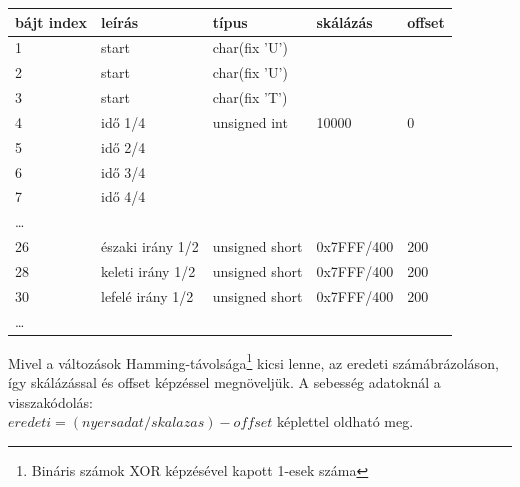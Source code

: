 \documentclass[12pt]{article}
\begin{document}
\begin{itemize}
\begin{center}
    \begin{tabular}{| l | l | l | l |l |}
    \hline
    bájt index & leírás & típus & skálázás & offset \\ \hline
    1 & start & char(fix 'U') &   &    \\ \hline
		2 & start & char(fix 'U') &   &    \\ \hline
		3 & start & char(fix 'T') &   &    \\ \hline
		4 & id\H{o} 1/4 & unsigned int & 10000 & 0  \\ \hline
		5 & id\H{o} 2/4 &   &   &    \\ \hline
		6 & id\H{o} 3/4 &   &   &    \\ \hline
		7 & id\H{o} 4/4 &   &   &    \\ \hline
		\dots &  &  &   &    \\ \hline
		26 & északi irány 1/2 & unsigned short & 0x7FFF/400 &  200 \\ \hline
		28 & keleti irány 1/2 & unsigned short & 0x7FFF/400 &  200 \\ \hline
		30 & lefelé irány 1/2 & unsigned short & 0x7FFF/400 &  200 \\ \hline
		\dots &   &   &   &    \\ \hline
		
    \hline
    \end{tabular}
\end{center}


Mivel a változások Hamming-távolsága\footnote{Bináris számok XOR képzésével kapott 1-esek száma} kicsi lenne, az eredeti számábrázoláson, így skálázással és offset képzéssel megnöveljük. A sebesség adatoknál a visszakódolás:\\
$eredeti  = (nyers adat/skalazas) - offset$ képlettel oldható meg. 


\end{itemize}
\end{document}

